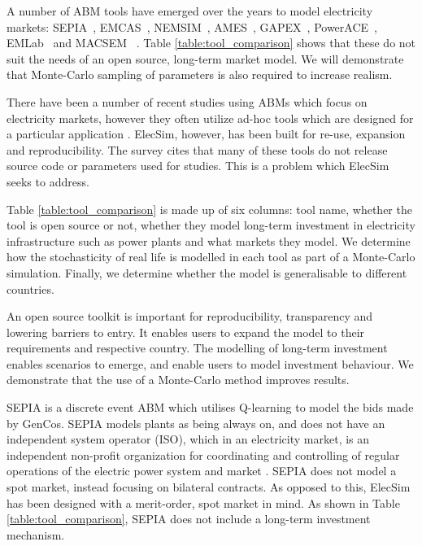 A number of ABM tools have emerged over the years to model electricity markets: SEPIA~\cite{Harp2000}, EMCAS~\cite{Conzelmann}, NEMSIM~\cite{Batten2006}, AMES~\cite{Sun2007}, GAPEX~\cite{Cincotti2013}, PowerACE~\cite{Rothengatter2007}, EMLab~\cite{Chappin2017} and MACSEM ~\cite{Praca2003}. Table \ref{table:tool_comparison} shows that these do not suit the needs of an open source, long-term market model. We will demonstrate that Monte-Carlo sampling of parameters is also required to increase realism.

There have been a number of recent studies using ABMs which focus on electricity markets, however they often utilize ad-hoc tools which are designed for a particular application \cite{Saxena2019, hadar2019, Kunzel2018}. ElecSim, however, has been built for re-use, expansion and reproducibility. The survey \cite{Weidlich2008} cites that many of these tools do not release source code or parameters used for studies. This is a problem which ElecSim seeks to address.

Table \ref{table:tool_comparison} is made up of six columns: tool name, whether the tool is open source or not, whether they model long-term investment in electricity infrastructure such as power plants and what markets they model. We determine how the stochasticity of real life is modelled in each tool as part of a Monte-Carlo simulation. Finally, we determine whether the model is generalisable to different countries. 


An open source toolkit is important for reproducibility, transparency and lowering barriers to entry. It enables users to expand the model to their requirements and respective country. The modelling of long-term investment enables scenarios to emerge, and enable users to model investment behaviour. We demonstrate that the use of a Monte-Carlo method improves results.

SEPIA \cite{Harp2000} is a discrete event ABM which utilises Q-learning to model the bids made by GenCos. SEPIA models plants as being always on, and does not have an independent system operator (ISO), which in an electricity market, is an independent non-profit organization for coordinating and controlling of regular operations of the electric power system and market \cite{Zhou2007}. SEPIA does not model a spot market, instead focusing on bilateral contracts. As opposed to this, ElecSim has been designed with a merit-order, spot market in mind. As shown in Table \ref{table:tool_comparison}, SEPIA does not include a long-term investment mechanism. 

